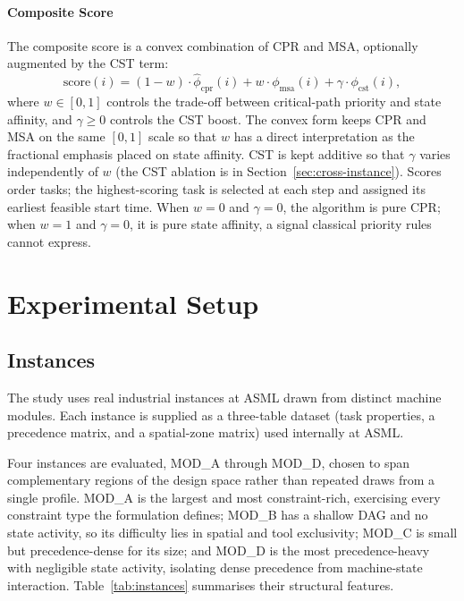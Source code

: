 \documentclass[conference]{IEEEtran}
\begin{document}
\paragraph{Composite Score}
The composite score is a convex combination of CPR and MSA,
optionally augmented by the CST term:
\begin{equation}
\text{score}(i) = (1 - w) \cdot \hat{\phi}_{\text{cpr}}(i)
                + w \cdot \phi_{\text{msa}}(i)
                + \gamma \cdot \phi_{\text{cst}}(i),
\label{eq:composite}
\end{equation}
where $w \in [0,1]$ controls the trade-off between critical-path
priority and state affinity, and $\gamma \geq 0$ controls the
CST boost. The convex form keeps CPR and MSA on the same $[0,1]$
scale so that $w$ has a direct interpretation as the fractional
emphasis placed on state affinity. CST is kept additive so that
$\gamma$ varies independently of $w$ (the CST ablation is in
Section~\ref{sec:cross-instance}). Scores order tasks; the
highest-scoring task is selected at each step and assigned its
earliest feasible start time.
When $w = 0$ and $\gamma = 0$, the algorithm is pure CPR; when
$w = 1$ and $\gamma = 0$, it is pure state affinity, a signal
classical priority rules cannot express.

\section{Experimental Setup}
\label{sec:experiments}

\subsection{Instances}
\label{sec:instances}

The study uses real industrial instances at ASML drawn from distinct
machine modules. Each instance is supplied as a three-table dataset
(task properties, a precedence matrix, and a spatial-zone matrix)
used internally at ASML.

Four instances are evaluated, MOD\_A through MOD\_D, chosen to span
complementary regions of the design space rather than repeated draws
from a single profile. MOD\_A is the largest and most constraint-rich,
exercising every constraint type the formulation defines; MOD\_B has a
shallow DAG and no state activity, so its difficulty lies in spatial
and tool exclusivity; MOD\_C is small but precedence-dense for its
size; and MOD\_D is the most precedence-heavy with negligible state
activity, isolating dense precedence from machine-state interaction.
Table~\ref{tab:instances} summarises their structural features.
\end{document}
